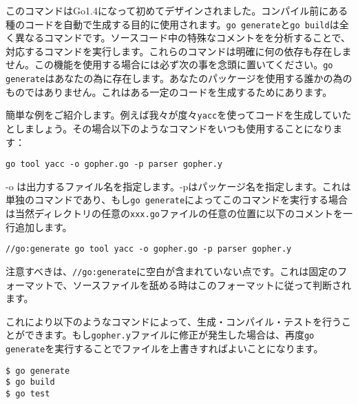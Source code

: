 このコマンドはGo1.4になって初めてデザインされました。コンパイル前にある種のコードを自動で生成する目的に使用されます。\texttt{go generate}と\texttt{go build}は全く異なるコマンドです。ソースコード中の特殊なコメントをを分析することで、対応するコマンドを実行します。これらのコマンドは明確に何の依存も存在しません。この機能を使用する場合には必ず次の事を念頭に置いてください。\texttt{go generate}はあなたの為に存在します。あなたのパッケージを使用する誰かの為のものではありません。これはある一定のコードを生成するためにあります。

簡単な例をご紹介します。例えば我々が度々\texttt{yacc}を使ってコードを生成していたとしましょう。その場合以下のようなコマンドをいつも使用することになります：


\begin{lstlisting}[numbers=none]
go tool yacc -o gopher.go -p parser gopher.y
\end{lstlisting}

-o は出力するファイル名を指定します。-pはパッケージ名を指定します。これは単独のコマンドであり、もし\texttt{go generate}によってこのコマンドを実行する場合は当然ディレクトリの任意の\texttt{xxx.go}ファイルの任意の位置に以下のコメントを一行追加します。

\begin{lstlisting}[numbers=none]
//go:generate go tool yacc -o gopher.go -p parser gopher.y
\end{lstlisting}

注意すべきは、\texttt{\//\//go:generate}に空白が含まれていない点です。これは固定のフォーマットで、ソースファイルを舐める時はこのフォーマットに従って判断されます。

これにより以下のようなコマンドによって、生成・コンパイル・テストを行うことができます。もし\texttt{gopher.y}ファイルに修正が発生した場合は、再度\texttt{go generate}を実行することでファイルを上書きすればよいことになります。

\begin{lstlisting}[numbers=none]
$ go generate
$ go build
$ go test
\end{lstlisting}



